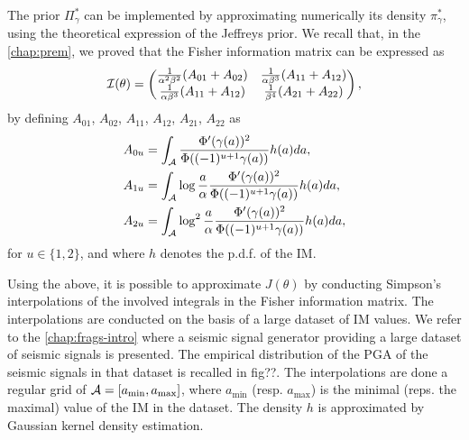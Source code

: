 The prior $\varPi_\gamma^\ast$ can be implemented by approximating numerically its density $\pi^\ast_\gamma$, using the theoretical expression of the Jeffreys prior.
We recall that, in the \cref{chap:prem}, we proved that %
the Fisher information matrix can be expressed as 
\begin{equation}
        \mathcal{I}(\theta)=\begin{pmatrix}
        \frac{1}{\alpha^2\beta^2}(A_{01} + A_{02}) & \frac{1}{\alpha\beta^3}(A_{11}+A_{12}) \\
        \frac{1}{\alpha\beta^3}(A_{11}+A_{12}) & \frac{1}{\beta^4}(A_{21}+A_{22})
    \end{pmatrix},
    \end{equation}
by defining 
$A_{01}$, $A_{02}$, $A_{11}$, $A_{12}$, $A_{21}$, $A_{22}$ as
    \begin{equation} %
    \begin{aligned}
        A_{0u} &= \int_\cA\frac{\Phi'(\gamma(a))^2}{\Phi((-1)^{u+1}\gamma(a))}h(a)da,\\
        A_{1u} &= \int_\cA\log\frac{a}{\alpha}\frac{\Phi'(\gamma(a))^2}{\Phi((-1)^{u+1}\gamma(a))}h(a)da,\\
        A_{2u} &= \int_\cA\log^2\frac{a}{\alpha}\frac{\Phi'(\gamma(a))^2}{\Phi((-1)^{u+1}\gamma(a))}h(a)da,
    \end{aligned}
    \end{equation}
for $u\in\{1,2\}$, and where $h$ denotes the p.d.f. of the IM.

Using the above, it is possible to approximate $J(\theta)$ by conducting Simpson's interpolations of the involved integrals in the Fisher information matrix. The interpolations are conducted on the basis of a large dataset of IM values. We refer to the \cref{chap:frags-intro} where a seismic signal generator providing a large dataset of seismic signals is presented. The empirical distribution of the PGA of the seismic signals in that dataset is recalled in fig??. %
The interpolations are done a regular grid of $\mathcal{A}=[a_{\min},a_{\max}]$, where $a_{\min}$ (resp. $a_{\max}$) is the minimal (reps. the maximal) value of the IM in the dataset.
The density $h$ is approximated by Gaussian kernel density estimation. 

